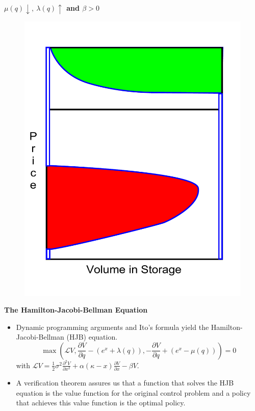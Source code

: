 \documentclass{beamer}
\begin{document}
\begin{frame}
{\bf $\mu(q) \downarrow,~ \lambda(q) \uparrow$ and $\beta > 0$}

\begin{figure}[hbt]
  \includegraphics[scale= 0.25]{NotConstCostBetaNot0.pdf}
\end{figure}


\end{frame}





\begin{frame}
{\bf The Hamilton-Jacobi-Bellman Equation}
\begin{itemize}
  \item Dynamic programming arguments and Ito's formula yield the Hamilton-Jacobi-Bellman (HJB) equation.
  \begin{equation*}
  \max\left( \mathcal{L} V, \frac{\partial V}{\partial q} - (e^x + \lambda(q)), -\frac{\partial V}{\partial q} + (e^x - \mu(q))\right) = 0
\end{equation*}
with $\mathcal{L}V = \frac{1}{2} \sigma^2 \frac{\partial^2 V}{\partial x^2} + \alpha (\kappa - x) \frac{\partial V}{\partial x} - \beta V$.


  \item A verification theorem assures us that a function that solves the HJB equation is the value function for the original control problem and a policy that achieves this value function is the optimal policy.

\end{itemize}

\end{frame}
\end{document}
